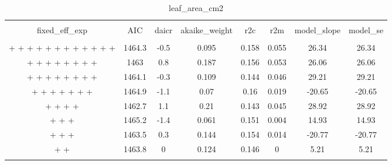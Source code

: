 
\begin{table}[!htbp] \centering 
  \caption{leaf_area_cm2} 
  \label{leaf_area_cm2} 
\begin{tabular}{@{\extracolsep{5pt}} cccccccc} 
\\[-1.8ex]\hline 
\hline \\[-1.8ex] 
fixed\_eff\_exp & AIC & daicr & akaike\_weight & r2c & r2m & model\_slope & model\_se \\ 
\hline \\[-1.8ex] 
 +  +  +  +  +  +  +  +  +  +  +  +  & 1464.3 & -0.5 & 0.095 & 0.158 & 0.055 & 26.34 & 26.34 \\ 
 +  +  +  +  +  +  +  +  & 1463 & 0.8 & 0.187 & 0.156 & 0.053 & 26.06 & 26.06 \\ 
 +  +  +  +  +  +  +  +  & 1464.1 & -0.3 & 0.109 & 0.144 & 0.046 & 29.21 & 29.21 \\ 
 +  +  +  +  +  +  +  & 1464.9 & -1.1 & 0.07 & 0.16 & 0.019 & -20.65 & -20.65 \\ 
 +  +  +  +  & 1462.7 & 1.1 & 0.21 & 0.143 & 0.045 & 28.92 & 28.92 \\ 
 +  +  +  & 1465.2 & -1.4 & 0.061 & 0.151 & 0.004 & 14.93 & 14.93 \\ 
 +  +  +  & 1463.5 & 0.3 & 0.144 & 0.154 & 0.014 & -20.77 & -20.77 \\ 
 +  +  & 1463.8 & 0 & 0.124 & 0.146 & 0 & 5.21 & 5.21 \\ 
\hline \\[-1.8ex] 
\end{tabular} 
\end{table} 
